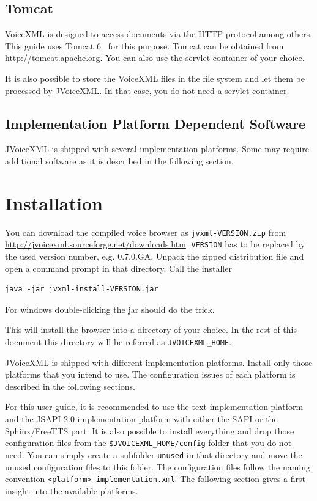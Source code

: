 \documentclass[11pt,a4paper]{book}
\begin{document}
\subsection{Tomcat}
\label{sec:tomcat}

VoiceXML is designed to access documents via the HTTP protocol among others. This
guide uses Tomcat 6~\cite{apache:tomcat} for this purpose.
Tomcat can be obtained
from \url{http://tomcat.apache.org}. You can also use the servlet container of
your choice.

It is also possible to store the VoiceXML files in the file system and let
them be processed by JVoiceXML. In that case, you do not need a servlet
container.

\subsection{Implementation Platform Dependent Software}

JVoiceXML is shipped with several implementation platforms. Some may require
additional software as it is described in the following section.

\section{Installation}
\label{sec:installation}

You can download the compiled voice browser as \texttt{jvxml-VERSION.zip} from 
\url{http://jvoicexml.sourceforge.net/downloads.htm}.
\texttt{VERSION} has to be replaced by the used version number, e.g. 0.7.0.GA.
Unpack the zipped distribution file and open a command prompt in that
directory. Call the installer 

\begin{lstlisting}
java -jar jvxml-install-VERSION.jar
\end{lstlisting}

For windows double-clicking the jar should do the trick. 

This will install the browser into a directory of your choice. In the rest of 
this document this directory will be referred as \lstinline{JVOICEXML_HOME}.

JVoiceXML is shipped with different implementation platforms. Install only
those platforms that you intend to use. The configuration issues of each
platform is described in the following sections.

For this user guide, it is recommended to use the text implementation platform
and the JSAPI 2.0 implementation platform with either the SAPI or the
Sphinx/FreeTTS part. It is also possible to install everything and drop those
configuration files from the \lstinline{$JVOICEXML_HOME/config} folder that you do not need. You
can simply create a subfolder \lstinline{unused} in that directory and move the
unused configuration files to this folder. The configuration files follow the
naming convention \lstinline{<platform>-implementation.xml}. The following
section gives a first insight into the available platforms.
\end{document}
